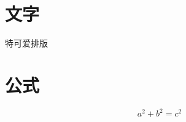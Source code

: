 \documentclass[UTF8] {ctexart}
\begin{document}
		
		\section{文字}
			特可爱排版
		\section{公式}
			\[
				a^2 + b^2 = c^2
			\]
				
	
\end{document}
